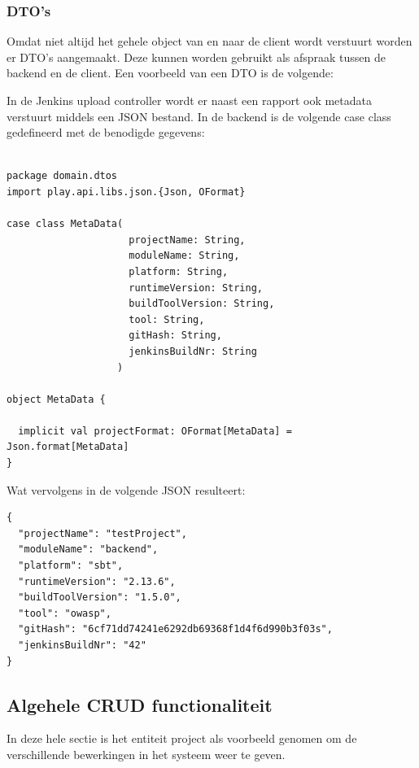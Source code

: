 
\subsubsection{DTO's}
Omdat niet altijd het gehele object van en naar de client wordt verstuurt worden er DTO's aangemaakt. Deze kunnen worden gebruikt als afspraak tussen de backend en de client. Een voorbeeld van een DTO is de volgende:

In de Jenkins upload controller wordt er naast een rapport ook metadata verstuurt middels een JSON bestand. In de backend is de volgende case class gedefineerd met de benodigde gegevens:
\begin{lstlisting}[caption={case class MetaData in MetaData.scala},label=lst:metdataScala]

package domain.dtos
import play.api.libs.json.{Json, OFormat}

case class MetaData(
                     projectName: String,
                     moduleName: String,
                     platform: String,
                     runtimeVersion: String,
                     buildToolVersion: String,
                     tool: String,
                     gitHash: String,
                     jenkinsBuildNr: String
                   )

object MetaData {

  implicit val projectFormat: OFormat[MetaData] = Json.format[MetaData]
}

\end{lstlisting}
\newpage
Wat vervolgens in de volgende JSON resulteert:
\begin{lstlisting}[caption={metadata JSON object behorende bij de case class}, label={lst:metadatajson}]
{
  "projectName": "testProject",
  "moduleName": "backend",
  "platform": "sbt",
  "runtimeVersion": "2.13.6",
  "buildToolVersion": "1.5.0",
  "tool": "owasp",
  "gitHash": "6cf71dd74241e6292db69368f1d4f6d990b3f03s",
  "jenkinsBuildNr": "42"
}
\end{lstlisting}
\subsection{Algehele CRUD functionaliteit}\label{subsec:algehele-crud-functionaliteit}
In deze hele sectie is het entiteit project als voorbeeld genomen om de verschillende bewerkingen in het systeem weer te geven.

